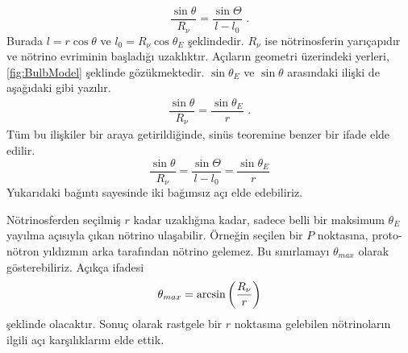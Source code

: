 \begin{equation}
    \frac{\sin \theta}{R_{\nu}} = \frac{\sin \Theta}{l-l_{0}} \text{ .}
\end{equation}
Burada $ l= r\cos \theta $ ve $ l_{0} = R_{\nu} \cos \theta_{E} $ şeklindedir. $ R_{\nu} $ ise nötrinosferin yarıçapıdır ve nötrino evriminin başladığı uzaklıktır. Açıların geometri üzerindeki yerleri, \ref{fig:BulbModel} şeklinde gözükmektedir. $ \sin \theta_{E} $ ve $ \sin \theta $ arasındaki ilişki de aşağıdaki gibi yazılır.
\begin{align}
    \dfrac{\sin \theta}{R_{\nu}} = \dfrac{\sin \theta_{E}}{r} \text{ .}
\end{align}
Tüm bu ilişkiler bir araya getirildiğinde, sinüs teoremine benzer bir ifade elde edilir.
\begin{equation}
	\frac{\sin \theta}{R_{\nu}} = \frac{\sin \Theta}{l-l_{0}}=\dfrac{\sin \theta_{E}}{r} \label{eq:AngleRelations}
\end{equation}
Yukarıdaki bağıntı sayesinde iki bağımsız açı elde edebiliriz. 

Nötrinosferden seçilmiş $ r $ kadar uzaklığına kadar, sadece belli bir maksimum $ \theta_{E} $ yayılma açısıyla çıkan nötrino ulaşabilir. Örneğin seçilen bir $ P $ noktasına, proto-nötron yıldızının arka tarafından nötrino gelemez. Bu sınırlamayı $ \theta_{max} $ olarak gösterebiliriz. Açıkça ifadesi
\begin{equation}
    \theta_{max}=\arcsin \qty(\frac{R_{\nu}}{r})
\end{equation}
şeklinde olacaktır. Sonuç olarak rastgele bir $ r $ noktasına gelebilen nötrinoların ilgili açı karşılıklarını elde ettik.

